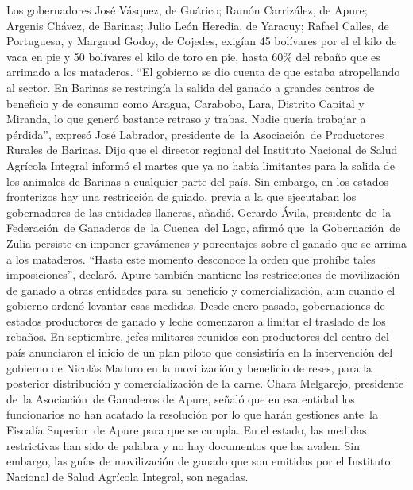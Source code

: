 \documentclass{article}%
\begin{document}
\newline%
%
Los gobernadores José Vásquez, de Guárico; Ramón Carrizález, de Apure; Argenis Chávez, de Barinas; Julio León Heredia, de Yaracuy; Rafael Calles, de Portuguesa, y Margaud Godoy, de Cojedes, exigían 45 bolívares por el el kilo de vaca en pie y 50 bolívares el kilo de toro en pie, hasta 60\% del rebaño que es arrimado a los mataderos.%
\newline%
%
“El gobierno se dio cuenta de que estaba atropellando al sector. En Barinas se restringía la salida del ganado a grandes centros de beneficio y de consumo como Aragua, Carabobo, Lara, Distrito Capital y Miranda, lo que generó bastante retraso y trabas. Nadie quería trabajar a pérdida”, expresó José Labrador, presidente de~la Asociación~de Productores Rurales de Barinas.%
\newline%
%
Dijo que el director regional del Instituto Nacional de Salud Agrícola Integral informó el martes que ya no había limitantes para la salida de los animales de Barinas a cualquier parte del país. Sin embargo, en los estados fronterizos hay una restricción de guiado, previa a la que ejecutaban los gobernadores de las entidades llaneras, añadió.%
\newline%
%
Gerardo Ávila, presidente de~la Federación~de Ganaderos de~la Cuenca~del Lago, afirmó que~la Gobernación~de Zulia persiste en imponer gravámenes y porcentajes sobre el ganado que se arrima a los mataderos. “Hasta este momento desconoce la orden que prohíbe tales imposiciones”, declaró.%
\newline%
%
Apure también mantiene las restricciones de movilización de ganado a otras entidades para su beneficio y comercialización, aun cuando el gobierno ordenó levantar esas medidas. Desde enero pasado, gobernaciones de estados productores de ganado y leche comenzaron a limitar el traslado de los rebaños.%
\newline%
%
En septiembre, jefes militares reunidos con productores del centro del país anunciaron el inicio de un plan piloto que consistiría en la intervención del gobierno de Nicolás Maduro en la movilización y beneficio de reses, para la posterior distribución y comercialización de la carne.%
\newline%
%
Chara Melgarejo, presidente de~la Asociación~de Ganaderos de Apure, señaló que en esa entidad los funcionarios no han acatado la resolución por lo que harán gestiones ante~la Fiscalía Superior~de Apure para que se cumpla. En el estado, las medidas restrictivas han sido de palabra y no hay documentos que las avalen. Sin embargo, las guías de movilización de ganado que son emitidas por el Instituto Nacional de Salud Agrícola Integral, son negadas.%
\end{document}
